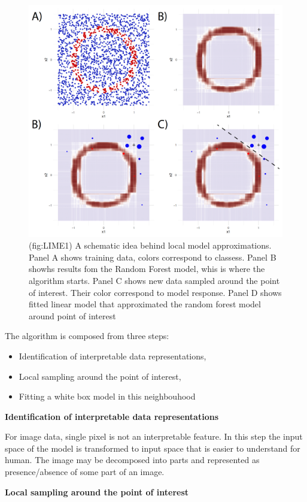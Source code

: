 \documentclass[]{krantz}
\providecommand{\tightlist}{%
  \setlength{\itemsep}{0pt}\setlength{\parskip}{0pt}}
\theoremstyle{definition}
\theoremstyle{definition}
\theoremstyle{definition}
\theoremstyle{remark}
\begin{document}
\begin{figure}

{\centering \includegraphics[width=0.7\linewidth]{figure/circle_4panels} 

}

\caption{(fig:LIME1) A schematic idea behind local model approximations. Panel A shows training data, colors correspond to classess. Panel B showhs results fom the Random Forest model, whis is where the algorithm starts. Panel C shows new data sampled around the point of interest. Their color correspond to model response. Panel D shows fitted linear model that approximated the random forest model around point of interest}\label{fig:LIME1}
\end{figure}

The algorithm is composed from three steps:

\begin{itemize}
\tightlist
\item
  Identification of interpretable data representations,
\item
  Local sampling around the point of interest,
\item
  Fitting a white box model in this neighbouhood
\end{itemize}

\textbf{Identification of interpretable data representations}

For image data, single pixel is not an interpretable feature. In this
step the input space of the model is transformed to input space that is
easier to understand for human. The image may be decomposed into parts
and represented as presence/absence of some part of an image.

\textbf{Local sampling around the point of interest}
\end{document}
